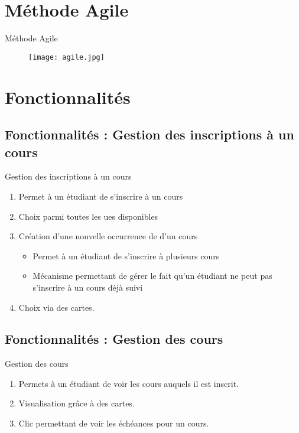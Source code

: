 \documentclass[numbering=fraction,10pt]{beamer}
\begin{document}
\section{Méthode Agile}
\begin{frame}{Méthode Agile}
    \begin{figure}
        \centering
        \texttt{[image: agile.jpg]}
        
    \end{figure}
\end{frame}
\section{Fonctionnalités}
\subsection{Fonctionnalités : Gestion des inscriptions à un cours}
\begin{frame}{Gestion des inscriptions à un cours}
    \begin{enumerate}
        \item Permet à un étudiant de s'inscrire à un cours
        \item Choix parmi toutes les ues disponibles
        \item Création d'une nouvelle occurrence de d'un cours
        \begin{itemize}
            \item Permet à un étudiant de s'inscrire à plusieurs cours
            \item Mécanisme permettant de gérer le fait qu'un étudiant ne peut pas s'inscrire à un cours déjà suivi
        \end{itemize}
        \item Choix via des cartes.
    \end{enumerate}
\end{frame}
\subsection{Fonctionnalités : Gestion des cours}
\begin{frame}{Gestion des cours}
    \begin{enumerate}
        \item Permets à un étudiant de voir les cours auquels il est inscrit.
        \item Visualisation grâce à des cartes.
        \item Clic permettant de voir les échéances pour un cours.
    \end{enumerate}
\end{frame}
\end{document}
